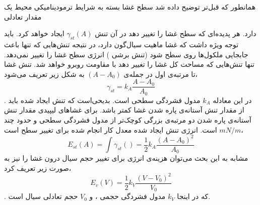 همانطور که قبل‌تر توضیح داده شد سطح غشا بسته به شرایط ترمودینامیکی محیط یک مقدار تعادلی 

دارد. هر پدیده‌ای که سطح غشا را تغییر دهد در آن تنش 
$\gamma_{st}(A)$
ایجاد خواهد کرد. باید توجه ویژه داشت که غشا ماهیت سیال‌گون دارد، در نتیجه تنش‌هایی که تنها باعث جابجایی ملکول‌ها روی سطح شود (تنش برشی
) انرژی سطح غشا را تغییر نمی‌دهد. تنها تنش‌هایی که مساحت کل غشا را تغییر دهد با مقاومت روبرو خواهد شد. تنش غشا تا مرتبه‌ی اول در جمله‌ی 
$(A-A_0)$
به شکل زیر تعریف می‌شود،
\begin{equation}
\gamma_{st}=k_A\frac{A-A_0}{A_0}
\end{equation}
. در این معادله
$k_A$
مدول فشردگی سطحی
است. بدیحی‌است که  تنش ایجاد شده باید از مقدار تنش آستانه‌ی پاره شدن غشا کمتر باشد. برای غشاهای لیپیدی مقدار تنش آستانه‌ی پاره شدن دو مرتبه‌ی بزرگی کوچک‌تر از مدول فشردگی سطحی و حدود چند
$mN/m$
است. انرژی تنش ایجاد شده معدل کار انجام شده برای تغییر سطح است،
\begin{equation}
E_{st}(A)=\int \gamma_{st}()=\frac{1}{2}k_A\frac{(A-A_0)^2}{A_0}
\label{eq:surfaceTension}
\end{equation}
مشابه به این بحث می‌توان هزینه‌ی انرژی برای تغییر حجم سیال درون غشا را نیز به صورت زیر تعریف کرد،
\begin{equation}
E_{v}(V)=\frac{1}{2}k_V\frac{(V-V_0)^2}{V_0}
\label{eq:volumeEnergy}
\end{equation}
. که در اینجا
$k_V$
مدول فشردگی حجمی
، و 
$V_0$
حجم تعادلی سیال است.







